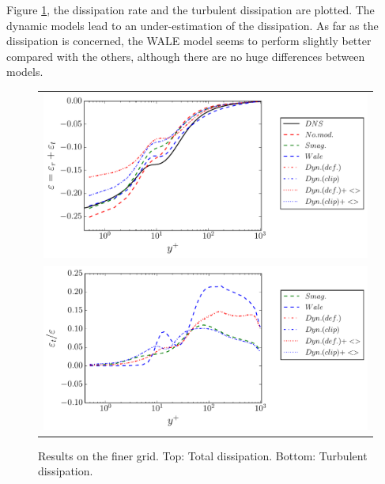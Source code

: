 \documentclass[a4paper]{article}
\begin{document}
Figure \ref{fig-finer-diss}, %
the dissipation rate and the turbulent dissipation are plotted. The dynamic models lead to an under-estimation of the dissipation. As far as the dissipation is concerned, the WALE model seems to perform slightly better compared with the others, although there are no huge differences between models.

\begin{figure}[htbp]
\begin{tabular}{c}
\includegraphics[width=\textwidth]{./finer/diss.pdf} \\
\includegraphics[width=\textwidth]{./finer/turb_diss.pdf}
\end{tabular}
\caption{Results on the finer grid. Top: %
Total dissipation. Bottom: Turbulent dissipation.}
\label{fig-finer-diss}
\end{figure}

\clearpage

\appendix
\end{document}
